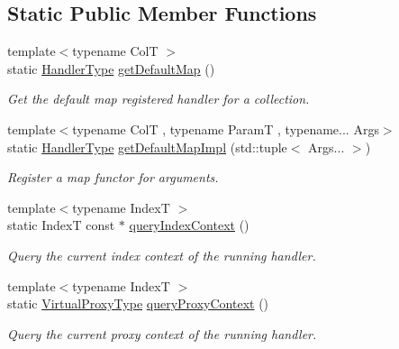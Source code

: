 \subsection*{Static Public Member Functions}
\begin{DoxyCompactItemize}
\item 
{\footnotesize template$<$typename ColT $>$ }\\static \hyperlink{namespacevt_af64846b57dfcaf104da3ef6967917573}{Handler\+Type} \hyperlink{structvt_1_1vrt_1_1collection_1_1_collection_manager_aa371f1cdd4eafa9f75b7eb40a6f151e0}{get\+Default\+Map} ()
\begin{DoxyCompactList}\small\item\em Get the default map registered handler for a collection. \end{DoxyCompactList}\item 
{\footnotesize template$<$typename ColT , typename ParamT , typename... Args$>$ }\\static \hyperlink{namespacevt_af64846b57dfcaf104da3ef6967917573}{Handler\+Type} \hyperlink{structvt_1_1vrt_1_1collection_1_1_collection_manager_ae92ad81b99b380b0b87b85f7dbda767a}{get\+Default\+Map\+Impl} (std\+::tuple$<$ Args... $>$)
\begin{DoxyCompactList}\small\item\em Register a map functor for arguments. \end{DoxyCompactList}\item 
{\footnotesize template$<$typename IndexT $>$ }\\static IndexT const  $\ast$ \hyperlink{structvt_1_1vrt_1_1collection_1_1_collection_manager_af192090e361f6239d6de2a3c80807421}{query\+Index\+Context} ()
\begin{DoxyCompactList}\small\item\em Query the current index context of the running handler. \end{DoxyCompactList}\item 
{\footnotesize template$<$typename IndexT $>$ }\\static \hyperlink{namespacevt_a1b417dd5d684f045bb58a0ede70045ac}{Virtual\+Proxy\+Type} \hyperlink{structvt_1_1vrt_1_1collection_1_1_collection_manager_a77d8832834659c44badf499c4770777b}{query\+Proxy\+Context} ()
\begin{DoxyCompactList}\small\item\em Query the current proxy context of the running handler. \end{DoxyCompactList}\item 

\end{DoxyCompactItemize}
